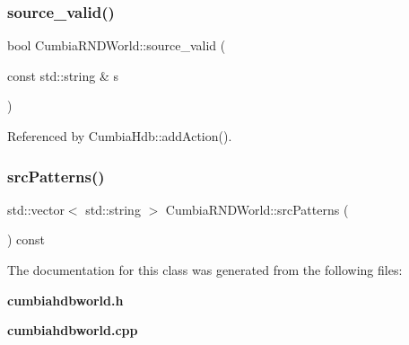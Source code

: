 \mbox{\label{classCumbiaHdbWorld_abfd31addddd25f915ba5085ab3b78f35}} 
\subsubsection{source\_valid()}
{\footnotesize\ttfamily bool Cumbia\+R\+N\+D\+World\+::source\+\_\+valid (\begin{DoxyParamCaption}\item[{const std\+::string \&}]{s }\end{DoxyParamCaption})}



Referenced by Cumbia\+Hdb\+::add\+Action().

\mbox{\label{classCumbiaHdbWorld_ad8acd70d172fe4b9bcfde3c79d90a4c5}} 
\subsubsection{srcPatterns()}
{\footnotesize\ttfamily std\+::vector$<$ std\+::string $>$ Cumbia\+R\+N\+D\+World\+::src\+Patterns (\begin{DoxyParamCaption}{ }\end{DoxyParamCaption}) const}



The documentation for this class was generated from the following files\+:\begin{DoxyCompactItemize}
\item 
\textbf{ cumbiahdbworld.\+h}\item 
\textbf{ cumbiahdbworld.\+cpp}\end{DoxyCompactItemize}
